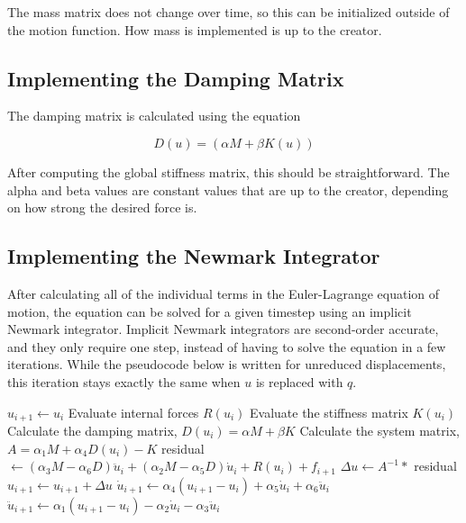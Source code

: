 \documentclass[twocolumn,10pt]{asme2ej}
\begin{document}
The mass matrix does not change over time, so this can be initialized outside of the motion function. How mass is implemented is up to the creator.

\subsection{Implementing the Damping Matrix}

The damping matrix is calculated using the equation

\begin{equation}
D(u) = (\alpha M + \beta K(u))
\label{eq_damp}
\end{equation}

After computing the global stiffness matrix, this should be straightforward. The alpha and beta values are constant values that are up to the creator, depending on how strong the desired force is.

\subsection{Implementing the Newmark Integrator}

After calculating all of the individual terms in the Euler-Lagrange equation of motion, the equation can be solved for a given timestep using an implicit Newmark integrator. Implicit Newmark integrators are second-order accurate, and they only require one step, instead of having to solve the equation in a few iterations. While the pseudocode below is written for unreduced displacements, this iteration stays exactly the same when $u$ is replaced with $q$.

\begin{algorithmic}[1]
      \State $u_{i + 1} \gets u_i$
      \State Evaluate internal forces $R(u_i)$
      \State Evaluate the stiffness matrix $K(u_i)$
      \State Calculate the damping matrix, $D(u_i) = \alpha M + \beta K$
      \State Calculate the system matrix, $A = \alpha_1M + \alpha_4D(u_i) - K$
      \State residual $\gets (\alpha_3M - \alpha_6D)\ddot u_{i} + (\alpha_2M - \alpha_5D)\dot u_{i} + R(u_i) + f_{i+1}$
      \State $ \Delta u \gets A^{-1} *$ residual
      \State $ u_{i + 1} \gets u_{i + 1} + \Delta u$
      \State $ \dot u_{i + 1} \gets \alpha_4(u_{i+1} - u_i) + \alpha_5 \dot u_i + \alpha_6 \ddot u_i$
      \State $ \ddot u_{i + 1} \gets \alpha_1(u_{i+1} - u_i) - \alpha_2 \dot u_i - \alpha_3 \ddot u_i$
    \EndFunction
\end{algorithmic}
\end{document}
